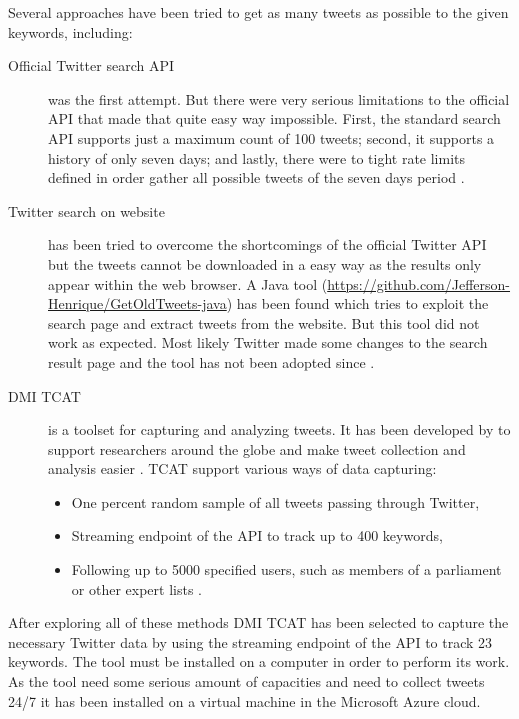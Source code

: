 Several approaches have been tried to get as many tweets as possible to the given keywords, including:

\begin{description}
  \item [Official Twitter search \ac{API}] 
    was the first attempt.
    But there were very serious limitations to the official \ac{API} that made that quite easy way impossible.
    First, the standard search \ac{API} supports just a maximum count of 100 tweets;
    second, it supports a history of only seven days;
    and lastly, there were to tight rate limits defined in order gather all possible tweets of the seven days period \cite{TwitterInc.2018}.

  \item [Twitter search on website]
    has been tried to overcome the shortcomings of the official Twitter \ac{API} but the tweets cannot be downloaded in a easy way as the results only appear within the web browser.
    A Java tool (\url{https://github.com/Jefferson-Henrique/GetOldTweets-java}) has been found which tries to exploit the search page and extract tweets from the website.
    But this tool did not work as expected.
    Most likely Twitter made some changes to the search result page and the tool has not been adopted since  \cite{Jefferson2016}.

  \item [DMI TCAT]
    is a toolset for capturing and analyzing tweets.
    It has been developed by \citeauthor{Borra2014} to support researchers around the globe and make tweet collection and analysis easier
    \cite{Borra2014}.
    TCAT support various ways of data capturing:
    \begin{itemize}
      \item One percent random sample of all tweets passing through Twitter,
      \item Streaming endpoint of the \ac{API} to track up to 400 keywords,
      \item Following up to 5000 specified users, such as members of a parliament or other expert lists \cite{Borra2014}.
    \end{itemize}

\end{description}

After exploring all of these methods DMI TCAT has been selected to capture the necessary Twitter data by using the streaming endpoint of the \ac{API} to track 23 keywords.
The tool must be installed on a computer in order to perform its work.
As the tool need some serious amount of capacities and need to collect tweets 24/7 it has been installed on a virtual machine in the Microsoft Azure cloud.

